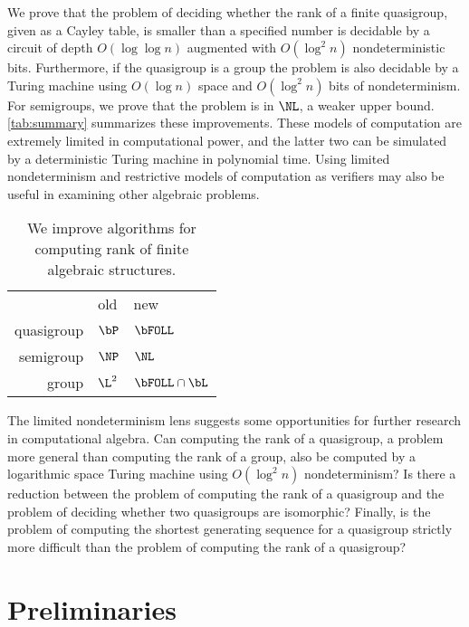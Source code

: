 \documentclass{article}
\begin{document}
%
We prove that the problem of deciding whether the rank of a finite quasigroup, given as a Cayley table, is smaller than a specified number is decidable by a circuit of depth $O(\log \log n)$ augmented with $O(\log^2 n)$ nondeterministic bits.
Furthermore, if the quasigroup is a group the problem is also decidable by a Turing machine using $O(\log n)$ space and $O(\log^2 n)$ bits of nondeterminism.
For semigroups, we prove that the problem is in $\NL$, a weaker upper bound.
\autoref{tab:summary} summarizes these improvements.
These models of computation are extremely limited in computational power, and the latter two can be simulated by a deterministic Turing machine in polynomial time.
Using limited nondeterminism and restrictive models of computation as verifiers may also be useful in examining other algebraic problems.

\begin{table}
  \caption{\label{tab:summary}We improve algorithms for computing rank of finite algebraic structures.}
  \begin{center}
    \begin{tabular}{r l l}
      & old & new \\[5pt]
      quasigroup & $\bP$ \autocite{py96} & $\bFOLL$ \\
      semigroup & $\NP$ & $\NL$ \\
      group & $\L^2$ \autocite{lsz77} & $\bFOLL \cap \bL$
    \end{tabular}
  \end{center}
\end{table}

The limited nondeterminism lens suggests some opportunities for further research in computational algebra.
Can computing the rank of a quasigroup, a problem more general than computing the rank of a group, also be computed by a logarithmic space Turing machine using $O(\log^2 n)$ nondeterminism?
Is there a reduction between the problem of computing the rank of a quasigroup and the problem of deciding whether two quasigroups are isomorphic?
Finally, is the problem of computing the shortest generating sequence for a quasigroup strictly more difficult than the problem of computing the rank of a quasigroup?

\section{Preliminaries}
\end{document}
